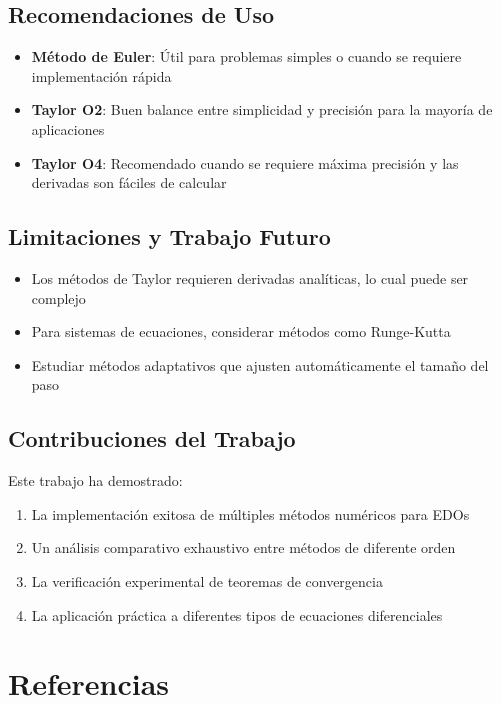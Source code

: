 \documentclass[12pt,a4paper]{article}
\begin{document}
\subsection{Recomendaciones de Uso}

\begin{itemize}
    \item \textbf{Método de Euler}: Útil para problemas simples o cuando se requiere implementación rápida
    \item \textbf{Taylor O2}: Buen balance entre simplicidad y precisión para la mayoría de aplicaciones
    \item \textbf{Taylor O4}: Recomendado cuando se requiere máxima precisión y las derivadas son fáciles de calcular
\end{itemize}

\subsection{Limitaciones y Trabajo Futuro}

\begin{itemize}
    \item Los métodos de Taylor requieren derivadas analíticas, lo cual puede ser complejo
    \item Para sistemas de ecuaciones, considerar métodos como Runge-Kutta
    \item Estudiar métodos adaptativos que ajusten automáticamente el tamaño del paso
\end{itemize}

\subsection{Contribuciones del Trabajo}

Este trabajo ha demostrado:

\begin{enumerate}
    \item La implementación exitosa de múltiples métodos numéricos para EDOs
    \item Un análisis comparativo exhaustivo entre métodos de diferente orden
    \item La verificación experimental de teoremas de convergencia
    \item La aplicación práctica a diferentes tipos de ecuaciones diferenciales
\end{enumerate}

\section{Referencias}
\end{document}
